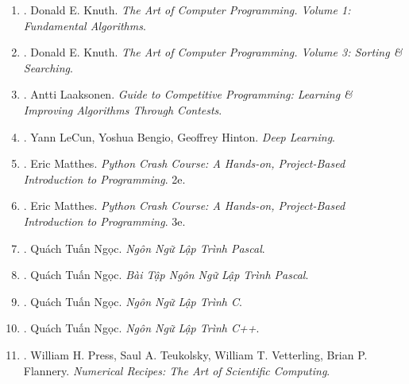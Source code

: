 \documentclass{article}
\begin{document}
\begin{enumerate}
	\item \cite{Knuth1997}. Donald E. Knuth. {\it The Art of Computer Programming. Volume 1: Fundamental Algorithms}.\hfill{\sf[reading]}
	
	\item \cite{Knuth1998}. Donald E. Knuth. {\it The Art of Computer Programming. Volume 3: Sorting \& Searching}.\hfill{\sf[reading]}
	
	\item \cite{Laaksonen2020}. Antti Laaksonen. {\it Guide to Competitive Programming: Learning \& Improving Algorithms Through Contests}.\hfill{\sf[reading]}
	
	\item \cite{LeCun_Bengio_Hinton2015}. Yann LeCun, Yoshua Bengio, Geoffrey Hinton. {\it Deep Learning}.\hfill{\sf[reading]}
	
	\item \cite{Matthes2019}. Eric Matthes. {\it Python Crash Course: A Hands-on, Project-Based Introduction to Programming}. 2e.\hfill{\sf[reading]}
	
	\item \cite{Matthes2023}. Eric Matthes. {\it Python Crash Course: A Hands-on, Project-Based Introduction to Programming}. 3e.\hfill{\sf[reading]}
	
	\item \cite{Ngoc_Pascal}. Quách Tuấn Ngọc. {\it Ngôn Ngữ Lập Trình Pascal}.\hfill{\sf[reading]}
	
	\item \cite{Ngoc_BT_Pascal}. Quách Tuấn Ngọc. {\it Bài Tập Ngôn Ngữ Lập Trình Pascal}.\hfill{\sf[reading]}
	
	\item \cite{Ngoc_C}. Quách Tuấn Ngọc. {\it Ngôn Ngữ Lập Trình C}.\hfill{\sf[reading]}
	
	\item \cite{Ngoc_C++}. Quách Tuấn Ngọc. {\it Ngôn Ngữ Lập Trình C++}.\hfill{\sf[done]}
	
	\item \cite{Press_Teukolsky_Vetterling_Flannery_recipe_C++}. {\sc William H. Press, Saul A. Teukolsky, William T. Vetterling, Brian P. Flannery}. {\it Numerical Recipes: The Art of Scientific Computing}. {}
	

\end{enumerate}
\end{document}

